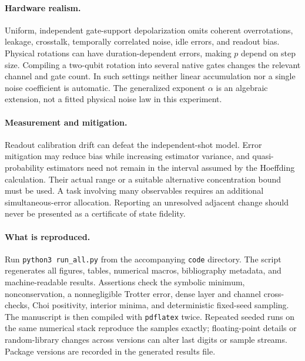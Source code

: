 \documentclass{article}
\begin{document}
\paragraph{Hardware realism.}
Uniform, independent gate-support depolarization omits coherent overrotations, leakage, crosstalk, temporally correlated noise, idle errors, and readout bias. Physical rotations can have duration-dependent errors, making $p$ depend on step size. Compiling a two-qubit rotation into several native gates changes the relevant channel and gate count. In such settings neither linear accumulation nor a single noise coefficient is automatic. The generalized exponent $\alpha$ is an algebraic extension, not a fitted physical noise law in this experiment.

\paragraph{Measurement and mitigation.}
Readout calibration drift can defeat the independent-shot model. Error mitigation may reduce bias while increasing estimator variance, and quasi-probability estimators need not remain in the interval assumed by the Hoeffding calculation. Their actual range or a suitable alternative concentration bound must be used. A task involving many observables requires an additional simultaneous-error allocation. Reporting an unresolved adjacent change should never be presented as a certificate of state fidelity.

\paragraph{What is reproduced.}
Run \texttt{python3\ run\_all.py} from the accompanying \texttt{code} directory. The script regenerates all figures, tables, numerical macros, bibliography metadata, and machine-readable results. Assertions check the symbolic minimum, nonconservation, a nonnegligible Trotter error, dense layer and channel cross-checks, Choi positivity, interior minima, and deterministic fixed-seed sampling. The manuscript is then compiled with \texttt{pdflatex} twice. Repeated seeded runs on the same numerical stack reproduce the samples exactly; floating-point details or random-library changes across versions can alter last digits or sample streams. Package versions are recorded in the generated results file.
\end{document}
